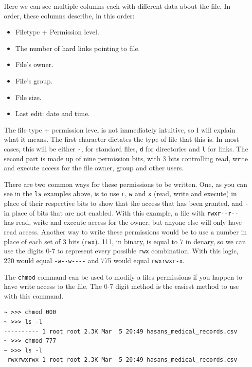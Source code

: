 Here we can see multiple columns each with different data about the file. In order, these columns describe, in this order:

\begin{itemize}
\tightlist
\item
  Filetype + Permission level.
\item
  The number of hard links pointing to file.
\item
  File's owner.
\item
  File's group.
\item
  File size.
\item
  Last edit: date and time.
\end{itemize}

The file type + permission level is not immediately intuitive, so I will explain what it means. The first character dictates the type of file that this is. In most cases, this will be either \texttt{-}, for standard files, \texttt{d} for directories and \texttt{l} for links. The second part is made up of nine permission bits, with 3 bits controlling read, write and execute access for the file owner, group and other users.

There are two common ways for these permissions to be written. One, as you can see in the \texttt{ls} examples above, is to use \texttt{r}, \texttt{w} and \texttt{x} (read, write and execute) in place of their respective bits to show that the access that has been granted, and \texttt{-} in place of bits that are not enabled. With this example, a file with \texttt{rwxr-\/-r-\/-} has read, write and execute access for the owner, but anyone else will only have read access. Another way to write these permissions would be to use a number in place of each set of 3 bits (\texttt{rwx}). 111, in binary, is equal to 7 in denary, so we can use the digits 0-7 to represent every possible \texttt{rwx} combination. With this logic, 220 would equal \texttt{-w-\/-w-\/-\/-\/-} and 775 would equal \texttt{rwxrwxr-x}.

The \texttt{chmod} command can be used to modify a files permissions if you happen to have write access to the file. The 0-7 digit method is the easiest method to use with this command.

\begin{verbatim}
~ >>> chmod 000
~ >>> ls -l
---------- 1 root root 2.3K Mar  5 20:49 hasans_medical_records.csv
~ >>> chmod 777
~ >>> ls -l
-rwxrwxrwx 1 root root 2.3K Mar  5 20:49 hasans_medical_records.csv
\end{verbatim}
